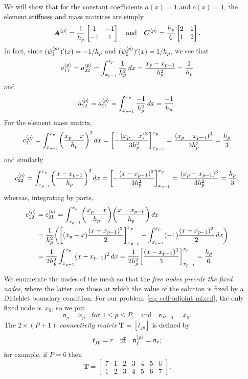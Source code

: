\begin{example}
We will show that for the constant coefficients $a(x)=1$ and $c(x)=1$, the
element stiffness and mass matrices are simply
\[
\boldsymbol{A}^{\langle p\rangle}=\frac{1}{h_p}\begin{bmatrix}1&-1\\ -1&1\end{bmatrix}
\quad\text{and}\quad
\boldsymbol{C}^{\langle p\rangle}=\frac{h_p}{6}\begin{bmatrix}2&1\\ 1&2\end{bmatrix}.
\]
In fact, since $(\psi^{\langle p\rangle}_1)'(x)=-1/h_p$ and 
$(\psi^{\langle p\rangle}_2)'(x)=1/h_p$, we see that
\[
a^{\langle p\rangle}_{11}=a^{\langle p\rangle}_{22}
    =\int_{x_{p-1}}^{x_p}\frac{1}{h_p^2}\,dx
    =\frac{x_p-x_{p-1}}{h_p^2}=\frac{1}{h_p}
\]
and
\[
a^{\langle p\rangle}_{12}=a^{\langle p\rangle}_{21}
    =\int_{x_{p-1}}^{x_p}\frac{-1}{h_p^2}\,dx=\frac{-1}{h_p}.
\]
For the element mass matrix,
\[
c^{\langle p\rangle}_{11}=\int_{x_{p-1}}^{x_p}\biggl(\frac{x_p-x}{h_p}\biggr)^2\,dx
    =\biggl[-\frac{(x_p-x)^3}{3h_p^2}\biggr]_{x_{p-1}}^{x_p}
    =\frac{(x_p-x_{p-1})^3}{3h_p^2}=\frac{h_p}{3}
\]
and similarly
\[
c^{\langle p\rangle}_{22}=\int_{x_{p-1}}^{x_p}\biggl(\frac{x-x_{p-1}}{h_p}\biggr)^2\,dx
    =\biggl[-\frac{(x-x_{p-1})^3}{3h_p^2}\biggr]_{x_{p-1}}^{x_p}
    =\frac{(x_p-x_{p-1})^3}{3h_p^2}=\frac{h_p}{3},
\]
whereas, integrating by parts,
\begin{align*}
c^{\langle p\rangle}_{12}&=c^{\langle p\rangle}_{21}=\int_{x_{p-1}}^{x_p}
    \biggl(\frac{x_p-x}{h_p}\biggr)\biggl(\frac{x-x_{p-1}}{h_p}\biggr)\,dx\\
    &=\frac{1}{h_p^2}\biggl(
    \biggl[(x_p-x)\frac{(x-x_{p-1})^2}{2}\biggr]_{x_{p-1}}^{x_p}
    -\int_{x_{p-1}}^{x_p}(-1)\frac{(x-x_{p-1})^2}{2}\,dx\biggr)\\
    &=\frac{1}{2h_p^2}\int_{x_{p-1}}^{x_p}(x-x_{p-1})^2\,dx
    =\frac{1}{2h_p^2}\biggl[\frac{(x-x_{p-1})^3}{3}\biggr]_{x_{p-1}}^{x_p}
    =\frac{h_p}{6}.
\end{align*}
\end{example}

We enumerate the nodes of the mesh so that the \emph{free nodes precede 
the fixed nodes}, where the latter are those at which the value of the 
solution is fixed by a Dirichlet boundary condition.  For our 
problem~\eqref{eq: self-adjoint mixed}, the only fixed node is~$x_0$, so we put
\[
\mathsf{n}_p=x_p\quad\text{for $1\le p\le P$,}
\quad\text{and}\quad\mathsf{n}_{P+1}=x_0.
\]
The $2\times(P+1)$ \emph{connectivity matrix} $\boldsymbol{T}=[t_{jp}]$ is 
defined by
\begin{equation}\label{eq: e pm def}
t_{jp}=r\quad\text{iff}\quad\mathsf{n}^{\langle p\rangle}_j=\mathsf{n}_r;
\end{equation}
for example, if $P=6$ then
\[
\boldsymbol{T}=\begin{bmatrix}
7&1&2&3&4&5&6\\
1&2&3&4&5&6&7\end{bmatrix}.
\]

